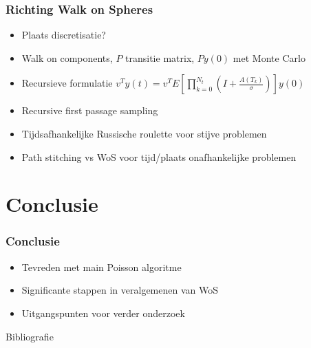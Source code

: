 \documentclass[18pt,aspectratio=149]{beamer}
\begin{document}
\begin{frame}
    \frametitle{Richting Walk on Spheres}
    \begin{itemize}
        \item<+->{Plaats discretisatie?}
        \item<+->{Walk on components, $P$ transitie matrix, $Py(0)$ met Monte Carlo}
        \item<+->{Recursieve formulatie $v^{T}y(t)= v^{T}E \left[\prod_{k=0}^{N_{t}}\left(I + \frac{A(T_{k})}{\sigma} \right) \right] y(0) $}
        \item<+->{Recursive first passage sampling}
        \item<+->{Tijdsafhankelijke Russische roulette voor stijve problemen}
        \item<+->{Path stitching vs WoS voor tijd/plaats onafhankelijke problemen}
    \end{itemize}

\end{frame}

\section{Conclusie}

\begin{frame}
    \tableofcontentscurrent
\end{frame}

\begin{frame}
    \frametitle{Conclusie}
    \begin{itemize}
        \item<+->{Tevreden met main Poisson algoritme}
        \item<+->{Significante stappen in veralgemenen van WoS}
        \item<+->{Uitgangspunten voor verder onderzoek}
    \end{itemize}

\end{frame}

\begin{frame}[allowframebreaks]{Bibliografie}
    \nocite{daun_randomized_2011,ermakov_monte_2021}
    \printbibliography
\end{frame}
\end{document}
